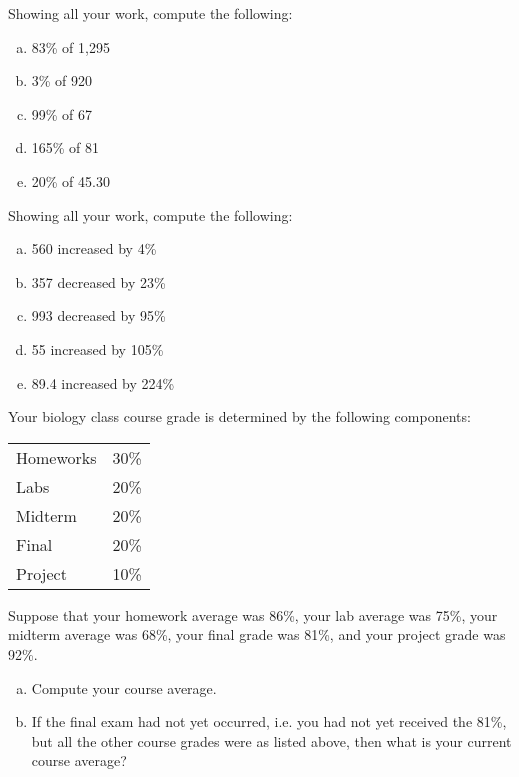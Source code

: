 \documentclass[11pt,letterpaper]{article}
\begin{document}

 Showing all your work, compute the following:
	\begin{enumerate}[(a)]
	\item 83\% of 1,295
	\item 3\% of 920
	\item 99\% of 67
	\item 165\% of 81
	\item 20\% of 45.30
	\end{enumerate}



\newpage



 Showing all your work, compute the following:
	\begin{enumerate}[(a)]
	\item 560 increased by 4\%
	\item 357 decreased by 23\%
	\item 993 decreased by 95\%
	\item 55 increased by 105\%
	\item 89.4 increased by 224\%
	\end{enumerate}



\newpage



 Your biology class course grade is determined by the following components: \par
	\begin{table}[h]
	\centering
	\begin{tabular}{lr}
	Homeworks & 30\% \\
	Labs & 20\% \\
	Midterm & 20\% \\
	Final & 20\% \\
	Project & 10\% \\
	\end{tabular}
	\end{table} \par
Suppose that your homework average was 86\%, your lab average was 75\%, your midterm average was 68\%, your final grade was 81\%, and your project grade was 92\%. 
	\begin{enumerate}[(a)]
	\item Compute your course average.
	\item If the final exam had not yet occurred, i.e. you had not yet received the 81\%, but all the other course grades were as listed above, then what is your current course average?
	\end{enumerate}
\end{document}
